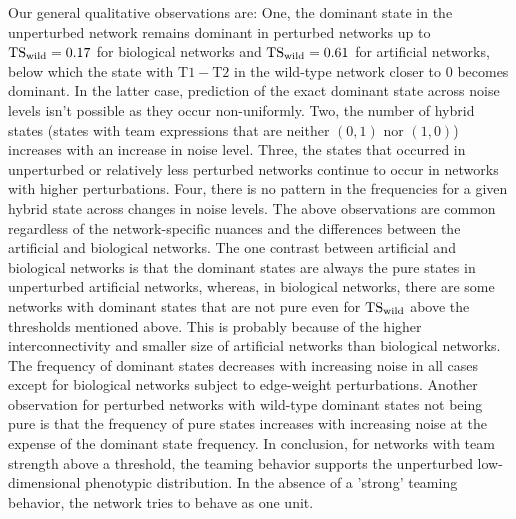 Our general qualitative observations are: One, the dominant state in the unperturbed network remains dominant in perturbed networks up to $\mathrm{TS_{wild}} = 0.17$ for biological networks and $\mathrm{TS_{wild}} = 0.61$ for artificial networks, below which the state with $\mathrm{T1-T2}$ in the wild-type network closer to $0$ becomes dominant. In the latter case, prediction of the exact dominant state across noise levels isn't possible as they occur non-uniformly. Two, the number of hybrid states (states with team expressions that are neither $(0,1)$ nor $(1,0)$) increases with an increase in noise level. Three, the states that occurred in unperturbed or relatively less perturbed networks continue to occur in networks with higher perturbations. Four, there is no pattern in the frequencies for a given hybrid state across changes in noise levels. The above observations are common regardless of the network-specific nuances and the differences between the artificial and biological networks. The one contrast between artificial and biological networks is that the dominant states are always the pure states in unperturbed artificial networks, whereas, in biological networks, there are some networks with dominant states that are not pure even for $\mathrm{TS_{wild}}$ above the thresholds mentioned above. This is probably because of the higher interconnectivity and smaller size of artificial networks than biological networks. The frequency of dominant states decreases with increasing noise in all cases except for biological networks subject to edge-weight perturbations. Another observation for perturbed networks with wild-type dominant states not being pure is that the frequency of pure states increases with increasing noise at the expense of the dominant state frequency. In conclusion, for networks with team strength above a threshold, the teaming behavior supports the unperturbed low-dimensional phenotypic distribution. In the absence of a 'strong' teaming behavior, the network tries to behave as one unit.

